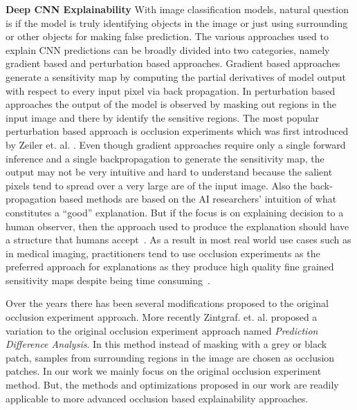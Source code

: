 \vspace{2mm}
\noindent \textbf{Deep CNN Explainability} With image classification models, natural question is if the model is truly identifying objects in the image or just using surrounding or other objects for making false prediction.
The various approaches used to explain CNN predictions can be broadly divided into two categories, namely gradient based and perturbation based approaches. Gradient based approaches generate a sensitivity map by computing the partial derivatives of model output with respect to every input pixel via back propagation.
In perturbation based approaches the output of the model is observed by masking out regions in the input image and there by identify the sensitive regions. The most popular perturbation based approach is occlusion experiments which was first introduced by Zeiler et. al. \cite{zeiler2014visualizing}.
Even though gradient approaches require only a single forward inference and a single backpropagation to generate the sensitivity map, the output may not be very intuitive and hard to understand because the salient pixels tend to spread over a very large are of the input image.
Also the back-propagation based methods are based on the AI researchers’ intuition of what constitutes a “good” explanation. But if the focus is on explaining decision to a human observer, then the approach used to produce the explanation should have a structure that humans accept~\cite{miller2017explanation}.
As a result in most real world use cases such as in medical imaging, practitioners tend to use occlusion experiments as the preferred approach for explanations as they produce high quality fine grained sensitivity maps despite being time consuming~\cite{jung2017deep}.

Over the years there has been several modifications proposed to the original occlusion experiment approach. More recently Zintgraf. et. al. \cite{zintgraf2017visualizing} proposed a variation to the original occlusion experiment approach named \textit{Prediction Difference Analysis}. In this method instead of masking with a grey or black patch, samples from surrounding regions in the image are chosen as occlusion patches.
In our work we mainly focus on the original occlusion experiment method. But, the methods and optimizations proposed in our work are readily applicable to more advanced occlusion based explainability approaches.